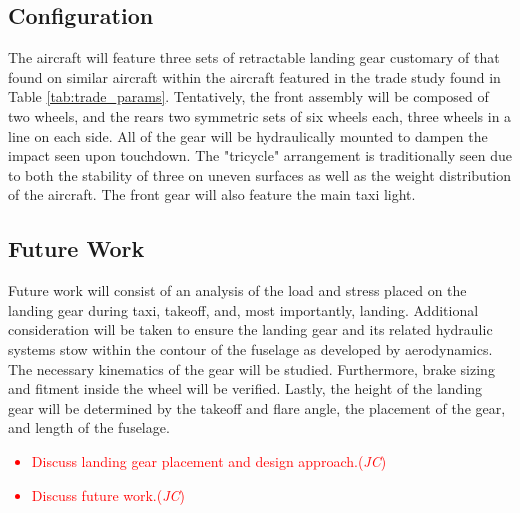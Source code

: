 \subsection{Configuration}
The aircraft will feature three sets of retractable landing gear customary of that found on similar aircraft within the aircraft featured in the trade study found in Table \ref{tab:trade_params}. Tentatively, the front assembly will be composed of two wheels, and the rears two symmetric sets of six wheels each, three wheels in a line on each side.  All of the gear will be hydraulically mounted to dampen the impact seen upon touchdown.  The "tricycle" arrangement is traditionally seen due to both the stability of three on uneven surfaces as well as the weight distribution of the aircraft.  The front gear will also feature the main taxi light.  

\subsection{Future Work}
Future work will consist of an analysis of the load and stress placed on the landing gear during taxi, takeoff, and, most importantly, landing.  Additional consideration will be taken to ensure the landing gear and its related hydraulic systems stow within the contour of the fuselage as developed by aerodynamics. The necessary kinematics of the gear will be studied. Furthermore, brake sizing and fitment inside the wheel will be verified. Lastly, the height of the landing gear will be determined by the takeoff and flare angle, the placement of the gear, and length of the fuselage.


\textcolor{red}{
\begin{itemize}
    \item Discuss landing gear placement and design approach.\checkmark (\textit{JC})
    \item Discuss future work.\checkmark (\textit{JC})
\end{itemize}}